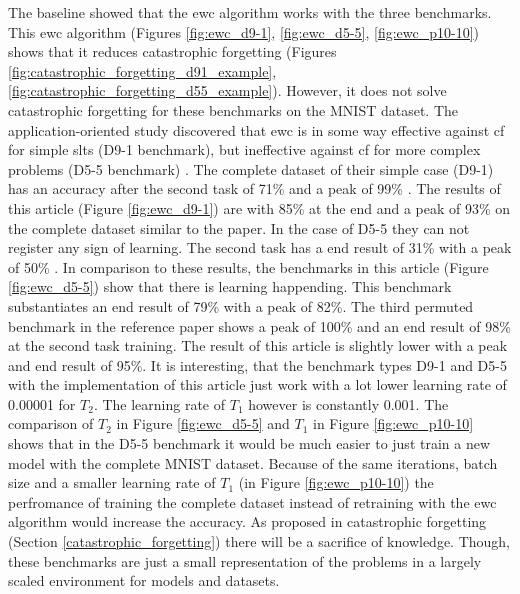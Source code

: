 The baseline showed that the \acrshort{ewc} algorithm works with the three benchmarks.
This \acrshort{ewc} algorithm (Figures \ref{fig:ewc_d9-1}, \ref{fig:ewc_d5-5}, \ref{fig:ewc_p10-10}) shows that it reduces catastrophic forgetting (Figures \ref{fig:catastrophic_forgetting_d91_example}, \ref{fig:catastrophic_forgetting_d55_example}).
However, it does not solve catastrophic forgetting for these benchmarks on the MNIST dataset.
\newline
The application-oriented study \cite{cf_application_oriented_study} discovered that \acrshort{ewc} is in some way effective against \acrlong{cf} for simple \acrshort{slt}s (D9-1 benchmark), but ineffective against \acrlong{cf} for more complex problems (D5-5 benchmark) \cite{cf_application_oriented_study}.
The complete dataset of their simple case (D9-1) has an accuracy after the second task of 71\% and a peak of 99\% \cite{cf_application_oriented_study}.
The results of this article (Figure \ref{fig:ewc_d9-1}) are with 85\% at the end and a peak of 93\% on the complete dataset similar to the paper.
In the case of D5-5 they can not register any sign of learning.
The second task has a end result of 31\% with a peak of 50\% \cite{cf_application_oriented_study}.
In comparison to these results, the benchmarks in this article (Figure \ref{fig:ewc_d5-5}) show that there is learning happending.
This benchmark substantiates an end result of 79\% with a peak of 82\%.
The third permuted benchmark in the reference paper \cite{cf_application_oriented_study} shows a peak of 100\% and an end result of 98\% at the second task training.
The result of this article is slightly lower with a peak and end result of 95\%.
\newline
It is interesting, that the benchmark types D9-1 and D5-5 with the implementation of this article just work with a lot lower learning rate of 0.00001 for $T_2$.
The learning rate of $T_1$ however is constantly 0.001.
\newline
The comparison of $T_2$ in Figure \ref{fig:ewc_d5-5} and $T_1$ in Figure \ref{fig:ewc_p10-10} shows that in the D5-5 benchmark it would be much easier to just train a new model with the complete MNIST dataset.
Because of the same iterations, batch size and a smaller learning rate of $T_1$ (in Figure \ref{fig:ewc_p10-10}) the perfromance of training the complete dataset instead of retraining with the \acrshort{ewc} algorithm would increase the accuracy.
As proposed in catastrophic forgetting (Section \ref{catastrophic_forgetting}) there will be a sacrifice of knowledge.
Though, these benchmarks are just a small representation of the problems in a largely scaled environment for models and datasets.

